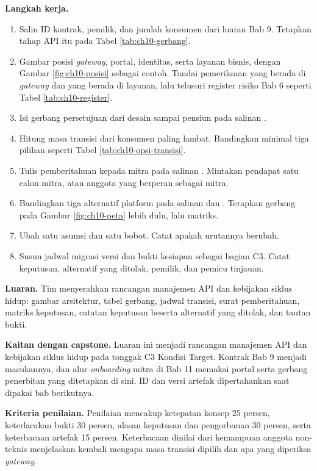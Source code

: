 \textbf{Langkah kerja.}
\begin{enumerate}
  \item Salin ID kontrak, pemilik, dan jumlah konsumen dari luaran Bab 9. Tetapkan tahap API itu pada Tabel
        \ref{tab:ch10-gerbang}.
  \item Gambar posisi \textit{gateway}, portal, identitas, serta layanan bisnis, dengan Gambar \ref{fig:ch10-posisi}
        sebagai contoh. Tandai pemeriksaan yang berada di \textit{gateway} dan yang berada di layanan, lalu telusuri
        register risiko Bab 6 seperti Tabel \ref{tab:ch10-register}.
  \item Isi gerbang persetujuan dari desain sampai pensiun pada salinan
        .
  \item Hitung masa transisi dari konsumen paling lambat. Bandingkan minimal tiga pilihan seperti Tabel
        \ref{tab:ch10-opsi-transisi}.
  \item Tulis pemberitahuan kepada mitra pada salinan .
        Mintakan pendapat satu calon mitra, atau anggota yang berperan sebagai mitra.
  \item Bandingkan tiga alternatif platform pada salinan  dan
        . Terapkan gerbang pada Gambar \ref{fig:ch10-peta}
        lebih dulu, lalu matriks.
  \item Ubah satu asumsi dan satu bobot. Catat apakah urutannya berubah.
  \item Susun jadwal migrasi versi dan bukti kesiapan sebagai bagian C3. Catat keputusan, alternatif yang ditolak,
        pemilik, dan pemicu tinjauan.
\end{enumerate}

\textbf{Luaran.} Tim menyerahkan rancangan manajemen API dan kebijakan siklus hidup: gambar arsitektur, tabel gerbang,
jadwal transisi, surat pemberitahuan, matriks keputusan, catatan keputusan beserta alternatif yang ditolak, dan tautan
bukti.

\textbf{Kaitan dengan capstone.} Luaran ini menjadi rancangan manajemen API dan kebijakan siklus hidup pada tonggak C3
Kondisi Target. Kontrak Bab 9 menjadi masukannya, dan alur \textit{onboarding} mitra di Bab 11 memakai portal serta
gerbang penerbitan yang ditetapkan di sini. ID dan versi artefak dipertahankan saat dipakai bab berikutnya.

\textbf{Kriteria penilaian.} Penilaian mencakup ketepatan konsep 25 persen, keterlacakan bukti 30 persen, alasan
keputusan dan pengorbanan 30 persen, serta keterbacaan artefak 15 persen. Keterbacaan dinilai dari kemampuan anggota
non-teknis menjelaskan kembali mengapa masa transisi dipilih dan apa yang diperiksa \textit{gateway}.

